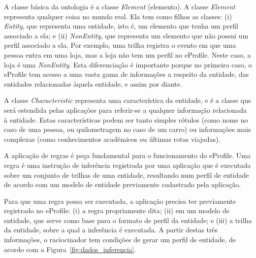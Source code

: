 \documentclass[times, 10pt, twocolumn]{article}
\begin{document}
A classe básica da ontologia é a classe {\em Element} (elemento). A classe {\em Element} representa qualquer coisa no mundo real. Ela tem como filhos as classes: (i) {\it Entity},  que representa uma entidade, isto é, um elemento que tenha um perfil associado a ela; e (ii) {\it NonEntity}, que representa um elemento que não possui um perfil associado a ela. Por exemplo, uma trilha registra o evento em que uma pessoa entra em uma loja, mas a loja não tem um perfil no eProfile. Neste caso, a loja é uma {\it NonEntity}. Esta diferenciação é importante porque no primeiro caso, o eProfile tem acesso a uma vasta gama de informações a respeito da entidade, das entidades relacionadas àquela entidade, e assim por diante.

A classe {\em Characteristic} representa uma característica da entidade, e é a classe que será estendida pelas aplicações para referir-se a qualquer informação relacionada à entidade. Estas características podem ser tanto simples rótulos (como nome no caso de uma pessoa, ou quilometragem no caso de um carro) ou informações mais complexas (como conhecimentos acadêmicos ou últimas rotas viajadas).




A aplicação de regras é peça fundamental para o funcionamento do eProfile. Uma regra é uma instrução de inferência registrada por uma aplicação que é executada sobre um conjunto de trilhas de uma entidade, resultando num perfil de entidade de acordo com um modelo de entidade previamente cadastrado pela aplicação.

Para que uma regra possa ser executada, a aplicação precisa ter previamente registrado no eProfile: (i) a regra propriamente dita; (ii) em um modelo de entidade, que serve como base para o formato de perfil da entidade; e (iii) a trilha da entidade, sobre a qual a inferência é executada. A partir destas três informações, o raciocinador tem condições de gerar um perfil de entidade, de acordo com a Figura~\ref{fig:dados_inferencia}.
\end{document}
